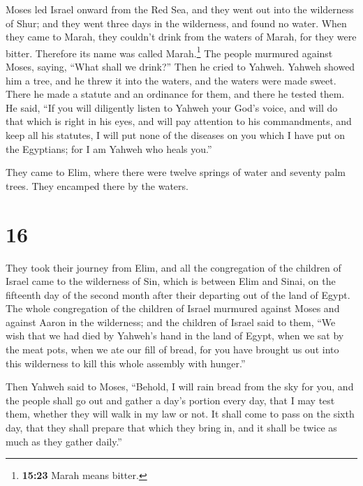  Moses led Israel onward from the Red Sea, and they went
out into the wilderness of Shur; and they went three days in the
wilderness, and found no water.  When they came to Marah,
they couldn't drink from the waters of Marah, for they were bitter.
Therefore its name was called Marah.\footnote{\textbf{15:23} Marah means
  bitter.}  The people murmured against Moses, saying,
``What shall we drink?''  Then he cried to Yahweh. Yahweh
showed him a tree, and he threw it into the waters, and the waters were
made sweet. There he made a statute and an ordinance for them, and there
he tested them.  He said, ``If you will diligently listen
to Yahweh your God's voice, and will do that which is right in his eyes,
and will pay attention to his commandments, and keep all his statutes, I
will put none of the diseases on you which I have put on the Egyptians;
for I am Yahweh who heals you.''

 They came to Elim, where there were twelve springs of
water and seventy palm trees. They encamped there by the waters.

\hypertarget{section-15}{%
\section{16}\label{section-15}}

 They took their journey from Elim, and all the
congregation of the children of Israel came to the wilderness of Sin,
which is between Elim and Sinai, on the fifteenth day of the second
month after their departing out of the land of Egypt.  The
whole congregation of the children of Israel murmured against Moses and
against Aaron in the wilderness;  and the children of
Israel said to them, ``We wish that we had died by Yahweh's hand in the
land of Egypt, when we sat by the meat pots, when we ate our fill of
bread, for you have brought us out into this wilderness to kill this
whole assembly with hunger.''

 Then Yahweh said to Moses, ``Behold, I will rain bread
from the sky for you, and the people shall go out and gather a day's
portion every day, that I may test them, whether they will walk in my
law or not.  It shall come to pass on the sixth day, that
they shall prepare that which they bring in, and it shall be twice as
much as they gather daily.''

